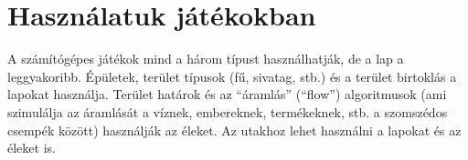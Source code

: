 \section*{Használatuk játékokban}

A számítógépes játékok mind a három típust használhatják, de a lap a leggyakoribb. Épületek, terület típusok (fű, sivatag, stb.) és a terület birtoklás a lapokat használja. Terület határok és az “áramlás” (“flow”) algoritmusok (ami szimulálja az áramlását a víznek, embereknek, termékeknek, stb. a szomszédos csempék között) használják az éleket. Az utakhoz lehet használni a lapokat és az éleket is.
